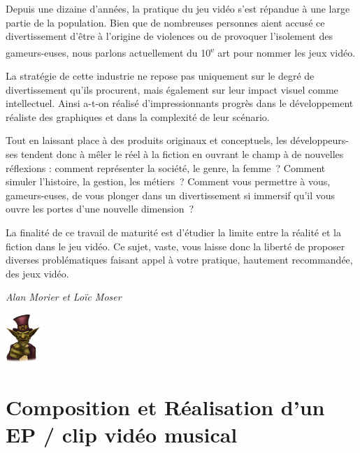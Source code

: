 \documentclass[
  10pt,
  french,
  a5paper,
  openany]{book}
\newenvironment{signature}{\begin{flushright}}{\end{flushright}}
\begin{document}

Depuis une dizaine d'années, la pratique du jeu vidéo s'est répandue à une large partie de la population. Bien que de nombreuses personnes aient accusé ce divertissement d'être à l'origine de violences ou de provoquer l'isolement des gameurs-euses, nous parlons actuellement du 10\textsuperscript{e} art pour nommer les jeux vidéo.

La stratégie de cette industrie ne repose pas uniquement sur le degré de divertissement qu'ils procurent, mais également sur leur impact visuel comme intellectuel. Ainsi a-t-on réalisé d'impressionnants progrès dans le développement réaliste des graphiques et dans la complexité de leur scénario.

Tout en laissant place à des produits originaux et conceptuels, les développeurs-ses tendent donc à mêler le réel à la fiction en ouvrant le champ à de nouvelles réflexions : comment représenter la société, le genre, la femme~? Comment simuler l'histoire, la gestion, les métiers~? Comment vous permettre à vous, gameurs-euses, de vous plonger dans un divertissement si immersif qu'il vous ouvre les portes d'une nouvelle dimension~?

\clearpage

La finalité de ce travail de maturité est d'étudier la limite entre la réalité et la fiction dans le jeu vidéo. Ce sujet, vaste, vous laisse donc la liberté de proposer diverses problématiques faisant appel à votre pratique, hautement recommandée, des jeux vidéo.

\begin{signature}
\emph{Alan Morier et Loïc Moser}

\end{signature}

\begin{flushright}
\includegraphics[width=\textwidth,height=5em]{images/le-jeu-video-fiction-ou-realite-2.jpg}

\end{flushright}

\hypertarget{composition-et-ruxe9alisation-dun-ep-clip-viduxe9o-musical}{%
\chapter{Composition et Réalisation d'un EP / clip vidéo musical}\label{composition-et-ruxe9alisation-dun-ep-clip-viduxe9o-musical}}
\end{document}
